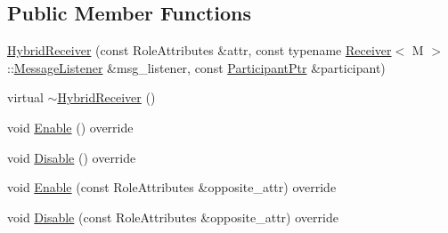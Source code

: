 \subsection*{Public Member Functions}
\begin{DoxyCompactItemize}
\item 
\hyperlink{classapollo_1_1cyber_1_1transport_1_1HybridReceiver_a626fda476274421711a50146d6218a69}{Hybrid\-Receiver} (const Role\-Attributes \&attr, const typename \hyperlink{classapollo_1_1cyber_1_1transport_1_1Receiver}{Receiver}$<$ M $>$\-::\hyperlink{classapollo_1_1cyber_1_1transport_1_1Receiver_abd906fd03582b49acbdc81b48a8974aa}{Message\-Listener} \&msg\-\_\-listener, const \hyperlink{namespaceapollo_1_1cyber_1_1transport_a4214d0780331276d0384d0b57e3bc688}{Participant\-Ptr} \&participant)
\item 
virtual \hyperlink{classapollo_1_1cyber_1_1transport_1_1HybridReceiver_ade26db508c0a771c4bf26ef3077d3fd9}{$\sim$\-Hybrid\-Receiver} ()
\item 
void \hyperlink{classapollo_1_1cyber_1_1transport_1_1HybridReceiver_a38add467c1fe59a584dac3a31b141c7c}{Enable} () override
\item 
void \hyperlink{classapollo_1_1cyber_1_1transport_1_1HybridReceiver_a90ed14fc589847bd9d5c7b8e1f3e4fd6}{Disable} () override
\item 
void \hyperlink{classapollo_1_1cyber_1_1transport_1_1HybridReceiver_aa4ec9837875d4f508be7f9098a69e5cb}{Enable} (const Role\-Attributes \&opposite\-\_\-attr) override
\item 
void \hyperlink{classapollo_1_1cyber_1_1transport_1_1HybridReceiver_ae4c99434d96215e60580dd14622c4482}{Disable} (const Role\-Attributes \&opposite\-\_\-attr) override
\end{DoxyCompactItemize}
